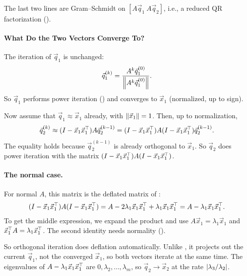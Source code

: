 The last two lines are Gram--Schmidt on $[A\vec{q}_1\ A\vec{q}_2]$, i.e., a reduced QR factorization ().

\paragraph{What Do the Two Vectors Converge To?}

The iteration of $\vec{q}_1$ is unchanged:
\begin{equation}
  \vec{q}_1^{(k)} = \frac{A^k\vec{q}_1^{(0)}}{\left\lVert A^k\vec{q}_1^{(0)} \right\rVert}.
\end{equation}
So $\vec{q}_1$ performs power iteration () and converges to $\vec{x}_1$ (normalized, up to sign).

Now assume that $\vec{q}_1 \approx \vec{x}_1$ already, with $\left\lVert \vec{x}_1 \right\rVert = 1$. Then, up to normalization,
\begin{equation}
  \vec{q}_2^{(k)} \approx (I - \vec{x}_1\vec{x}_1^\top)A\vec{q}_2^{(k-1)} = (I - \vec{x}_1\vec{x}_1^\top)A(I - \vec{x}_1\vec{x}_1^\top)\vec{q}_2^{(k-1)}.
\end{equation}
The equality holds because $\vec{q}_2^{(k-1)}$ is already orthogonal to $\vec{x}_1$. So $\vec{q}_2$ does power iteration with the matrix $(I - \vec{x}_1\vec{x}_1^\top)A(I - \vec{x}_1\vec{x}_1^\top)$.

\paragraph{The normal case.} For normal $A$, this matrix is the deflated matrix of :
\begin{equation}
  (I - \vec{x}_1\vec{x}_1^\top)A(I - \vec{x}_1\vec{x}_1^\top) = A - 2\lambda_1\vec{x}_1\vec{x}_1^\top + \lambda_1\vec{x}_1\vec{x}_1^\top = A - \lambda_1\vec{x}_1\vec{x}_1^\top.
  \label{eq:orth-iter-deflation}
\end{equation}
To get the middle expression, we expand the product and use $A\vec{x}_1 = \lambda_1\vec{x}_1$ and $\vec{x}_1^\top A = \lambda_1\vec{x}_1^\top$. The second identity needs normality ().

So orthogonal iteration does deflation automatically. Unlike , it projects out the current $\vec{q}_1$, not the converged $\vec{x}_1$, so both vectors iterate at the same time. The eigenvalues of $A - \lambda_1\vec{x}_1\vec{x}_1^\top$ are $0, \lambda_2, \dots, \lambda_m$, so $\vec{q}_2 \to \vec{x}_2$ at the rate $\left\lvert \lambda_3/\lambda_2 \right\rvert$.


